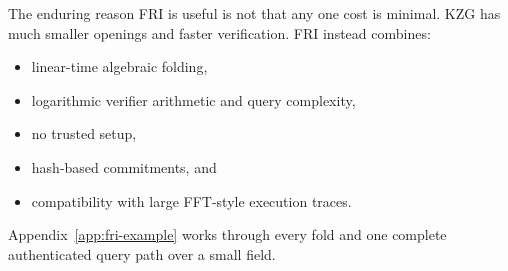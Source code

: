 The enduring reason FRI is useful is not that any one cost is minimal. KZG has much smaller
openings and faster verification. FRI instead combines:
\begin{itemize}[leftmargin=2em]
    \item linear-time algebraic folding,
    \item logarithmic verifier arithmetic and query complexity,
    \item no trusted setup,
    \item hash-based commitments, and
    \item compatibility with large FFT-style execution traces.
\end{itemize}
Appendix~\ref{app:fri-example} works through every fold and one complete authenticated query
path over a small field.
